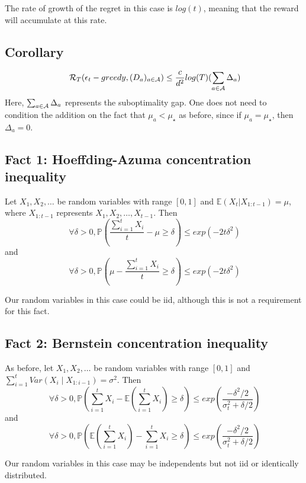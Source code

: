 \documentclass[11pt]{article}
\begin{document}
The rate of growth of the regret in this case is $log(t)$, meaning that the reward will accumulate at this rate.

\subsection{Corollary}
\[
\ \mathcal{R}_T(\epsilon_t-greedy, (D_a)_{a \in \mathcal{A}}) \le \frac{c}{d^2} log(T) (\sum_{a \in \mathcal{A}} \Delta_a)
\]
Here, $\sum_{a \in \mathcal{A}} \Delta_a$ represents the suboptimality gap.  One does not need to condition the addition on the fact that $\mu_a < \mu_\star$ as before, since if $\mu_a = \mu_\star$, then $\Delta_a = 0$.  

\subsection{Fact 1: Hoeffding-Azuma concentration inequality}
Let $X_1, X_2, \ldots$ be random variables with range $[0, 1]$ and $\mathbb{E}(X_t | X_{1:t-1}) = \mu$, where $X_{1:t-1}$ represents $X_1, X_2, \ldots, X_{t-1}$.  Then 
\[
\ \forall \delta > 0, \mathbb{P}(\frac{\sum_{i=1}^t X_i}{t} - \mu \ge \delta) \le exp(-2t\delta^2)
\]
 and 
 \[
 \ \forall \delta >0, \mathbb{P}(\mu -\frac{\sum_{i=1}^t X_i}{t} \ge \delta) \le exp(-2t\delta^2)
 \]

Our random variables in this case could be iid, although this is not a requirement for this fact.

\subsection{Fact 2: Bernstein concentration inequality}
As before, let $X_1, X_2, \ldots$ be random variables with range $[0,1]$ and $\sum_{i=1}^t Var(X_i \mid X_{1:i-1}) = \sigma^2$.  Then 
\[
\ \forall \delta>0, \mathbb{P} (\sum_{i=1}^t X_i - \mathbb{E} (\sum_{i=1}^t X_i) \ge \delta) \le exp(\frac{-\delta^2/2}{\sigma_t^2+ \delta/2})
\]
and 
\[
\ \forall \delta >0, \mathbb{P} (\mathbb{E} (\sum_{i=1}^t X_i) - \sum_{i=1}^t X_i \ge \delta) \le exp(\frac{-\delta^2/2}{\sigma_t^2+ \delta/2})
\]

Our random variables in this case may be independents but not iid or identically distributed.


\end{document}
